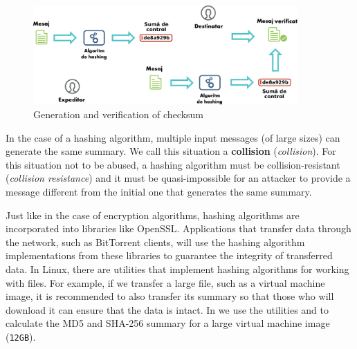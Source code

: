 \begin{figure}[htbp]
  \centering
  \def\svgwidth{\columnwidth}
  \includegraphics[width=0.9\textwidth]{chapters/12-auth/img/checksum.svg.pdf}
  \caption{Generation and verification of checksum}
  \label{fig:sec:checksum}
\end{figure}

In the case of a hashing algorithm, multiple input messages (of large sizes) can generate the same summary.
We call this situation a \textbf{collision} (\textit{collision}).
For this situation not to be abused, a hashing algorithm must be collision-resistant (\textit{collision resistance}) and it must be quasi-impossible for an attacker to provide a message different from the initial one that generates the same summary.

Just like in the case of encryption algorithms, hashing algorithms are incorporated into libraries like OpenSSL.
Applications that transfer data through the network, such as BitTorrent clients, will use the hashing algorithm implementations from these libraries to guarantee the integrity of transferred data.
In Linux, there are utilities that implement hashing algorithms for working with files.
For example, if we transfer a large file, such as a virtual machine image, it is recommended to also transfer its summary so that those who will download it can ensure that the data is intact.
In  we use the utilities  and  to calculate the MD5 and SHA-256 summary for a large virtual machine image (\texttt{12GB}).

